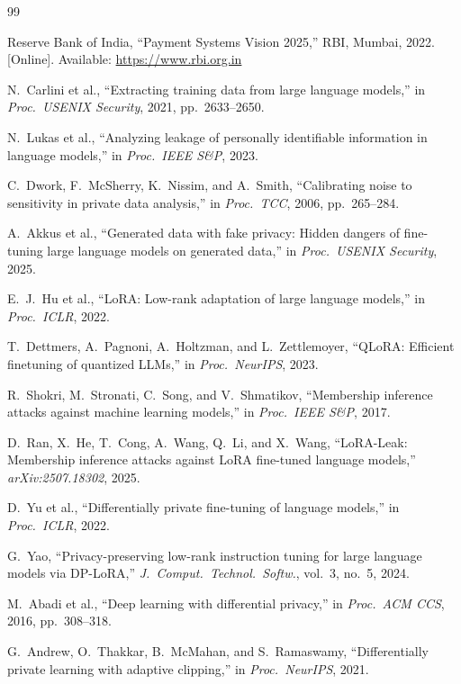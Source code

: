 \documentclass[conference]{IEEEtran}
\begin{document}
\begin{thebibliography}{99}

Reserve Bank of India, ``Payment Systems Vision 2025,'' RBI, Mumbai, 2022. [Online]. Available: \url{https://www.rbi.org.in}

N.~Carlini et al., ``Extracting training data from large language models,'' in \textit{Proc.\ USENIX Security}, 2021, pp.~2633--2650.

N.~Lukas et al., ``Analyzing leakage of personally identifiable information in language models,'' in \textit{Proc.\ IEEE S\&P}, 2023.

C.~Dwork, F.~McSherry, K.~Nissim, and A.~Smith, ``Calibrating noise to sensitivity in private data analysis,'' in \textit{Proc.\ TCC}, 2006, pp.~265--284.

A.~Akkus et al., ``Generated data with fake privacy: Hidden dangers of fine-tuning large language models on generated data,'' in \textit{Proc.\ USENIX Security}, 2025.

E.~J.~Hu et al., ``LoRA: Low-rank adaptation of large language models,'' in \textit{Proc.\ ICLR}, 2022.

T.~Dettmers, A.~Pagnoni, A.~Holtzman, and L.~Zettlemoyer, ``QLoRA: Efficient finetuning of quantized LLMs,'' in \textit{Proc.\ NeurIPS}, 2023.

R.~Shokri, M.~Stronati, C.~Song, and V.~Shmatikov, ``Membership inference attacks against machine learning models,'' in \textit{Proc.\ IEEE S\&P}, 2017.

D.~Ran, X.~He, T.~Cong, A.~Wang, Q.~Li, and X.~Wang, ``LoRA-Leak: Membership inference attacks against LoRA fine-tuned language models,'' \textit{arXiv:2507.18302}, 2025.

D.~Yu et al., ``Differentially private fine-tuning of language models,'' in \textit{Proc.\ ICLR}, 2022.

G.~Yao, ``Privacy-preserving low-rank instruction tuning for large language models via DP-LoRA,'' \textit{J.\ Comput.\ Technol.\ Softw.}, vol.~3, no.~5, 2024.

M.~Abadi et al., ``Deep learning with differential privacy,'' in \textit{Proc.\ ACM CCS}, 2016, pp.~308--318.

G.~Andrew, O.~Thakkar, B.~McMahan, and S.~Ramaswamy, ``Differentially private learning with adaptive clipping,'' in \textit{Proc.\ NeurIPS}, 2021.


\end{thebibliography}
\end{document}
